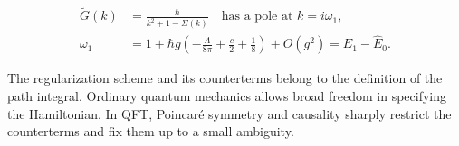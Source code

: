 \begin{equation}
 \begin{aligned}
 \widetilde G(k)&=\frac{\hbar}{k^2+1-\Sigma(k)}
 \quad\text{has a pole at }k=i\omega_1,\\
 \omega_1&=1+\hbar g\left(-\frac{\Lambda}{8\pi}
 +\frac{c}{2}+\frac{1}{8}\right)+O(g^2)
 =\widehat E_1-\widehat E_0.
 \end{aligned}
 \label{eq:253a-renormalized-gap}
\end{equation}

The regularization scheme and its counterterms belong to the definition of the
path integral. Ordinary quantum mechanics allows broad freedom in specifying
the Hamiltonian. In QFT, Poincar\'e symmetry and causality sharply restrict the
counterterms and fix them up to a small ambiguity.

